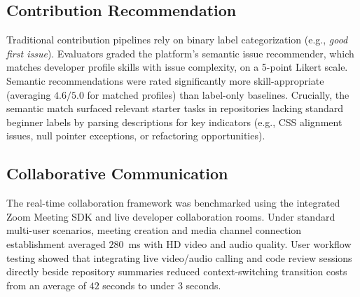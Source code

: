 \subsection{Contribution Recommendation}
Traditional contribution pipelines rely on binary label categorization (e.g., \textit{good first issue}). Evaluators graded the platform's semantic issue recommender, which matches developer profile skills with issue complexity, on a 5-point Likert scale. Semantic recommendations were rated significantly more skill-appropriate (averaging $4.6 / 5.0$ for matched profiles) than label-only baselines. Crucially, the semantic match surfaced relevant starter tasks in repositories lacking standard beginner labels by parsing descriptions for key indicators (e.g., CSS alignment issues, null pointer exceptions, or refactoring opportunities).

\subsection{Collaborative Communication}
The real-time collaboration framework was benchmarked using the integrated Zoom Meeting SDK and live developer collaboration rooms. Under standard multi-user scenarios, meeting creation and media channel connection establishment averaged $280$~ms with HD video and audio quality. User workflow testing showed that integrating live video/audio calling and code review sessions directly beside repository summaries reduced context-switching transition costs from an average of $42$ seconds to under $3$ seconds.
